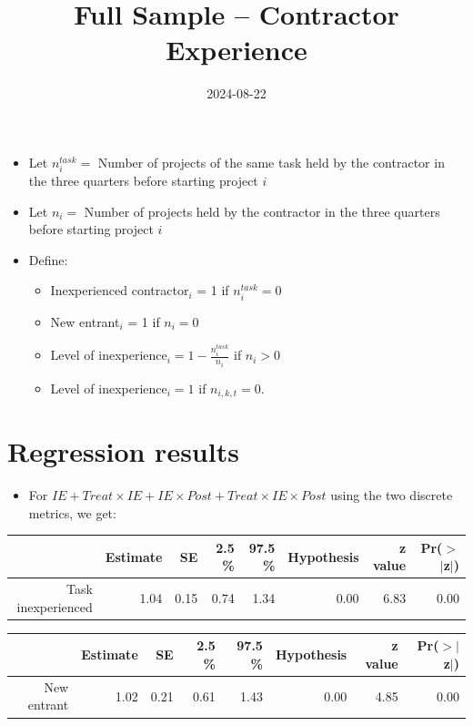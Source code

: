 \documentclass[
]{article}
\title{Full Sample -- Contractor Experience}
\author{}
\date{\vspace{-2.5em}2024-08-22}
\providecommand{\tightlist}{%
  \setlength{\itemsep}{0pt}\setlength{\parskip}{0pt}}
\begin{document}
\maketitle

\begin{itemize}
\item
  Let \(n^{task}_{i}=\) Number of projects of the same task held by the
  contractor in the three quarters before starting project \(i\)
\item
  Let \(n_{i}=\) Number of projects held by the contractor in the three
  quarters before starting project \(i\)
\item
  Define:

  \begin{itemize}
  \tightlist
  \item
    Inexperienced contractor\(_i\) = 1 if \(n^{task}_{i}=0\)
  \item
    New entrant\(_i\) = 1 if \(n_{i}=0\)
  \item
    Level of inexperience\(_{i}= 1 - \frac{n^{task}_{i}}{n_{i}}\) if
    \(n_{i}>0\)
  \item
    Level of inexperience\(_{i}= 1\) if \(n_{i,k,t}=0\).
  \end{itemize}
\end{itemize}

\hypertarget{regression-results}{%
\section{Regression results}\label{regression-results}}

\begin{itemize}
\tightlist
\item
  For
  \(IE + Treat \times IE + IE \times Post + Treat \times IE \times Post\)
  using the two discrete metrics, we get:
\end{itemize}

\begin{table}[ht]
\centering
\begin{tabular}{rrrrrrrr}
  \hline
 & Estimate & SE & 2.5 \% & 97.5 \% & Hypothesis & z value & Pr($>$$|$z$|$) \\ 
  \hline
Task inexperienced & 1.04 & 0.15 & 0.74 & 1.34 & 0.00 & 6.83 & 0.00 \\ 
   \hline
\end{tabular}
\end{table}
\begin{table}[ht]
\centering
\begin{tabular}{rrrrrrrr}
  \hline
 & Estimate & SE & 2.5 \% & 97.5 \% & Hypothesis & z value & Pr($>$$|$z$|$) \\ 
  \hline
New entrant & 1.02 & 0.21 & 0.61 & 1.43 & 0.00 & 4.85 & 0.00 \\ 
   \hline
\end{tabular}
\end{table}
\end{document}
